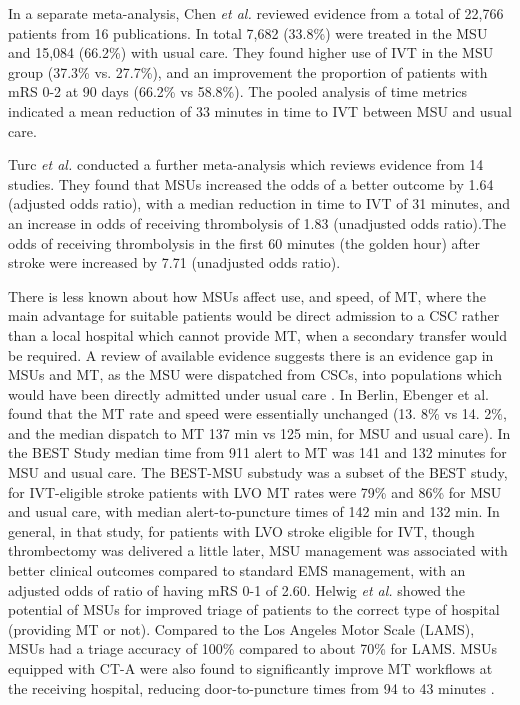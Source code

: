 In a separate meta-analysis, Chen \textit{et al.} \cite{chen_systematic_2022} reviewed evidence from a total of 22,766 patients from 16 publications. In total 7,682 (33.8\%) were treated in the MSU and 15,084 (66.2\%) with usual care. They found higher use of IVT in the MSU group (37.3\% vs. 27.7\%), and an improvement the proportion of patients with mRS 0-2 at 90 days (66.2\% vs 58.8\%).  The pooled analysis of time metrics indicated a mean reduction of 33 minutes in time to IVT between MSU and usual care.

Turc \textit{ et al.} \cite{turc_comparison_2022} conducted a further meta-analysis which reviews evidence from 14 studies. They found that MSUs increased the odds of a better outcome by 1.64 (adjusted odds ratio), with a median reduction in time to IVT of 31 minutes, and an increase in odds of receiving thrombolysis of 1.83 (unadjusted odds ratio).The odds of receiving thrombolysis in the first 60 minutes (the golden hour) after stroke were increased by 7.71 (unadjusted odds ratio).

There is less known about how MSUs affect use, and speed, of MT, where the main advantage for suitable patients would be direct admission to a CSC rather than a local hospital which cannot provide MT, when a secondary transfer would be required. A review of available evidence suggests there is an evidence gap in MSUs and MT, as the MSU were dispatched from CSCs, into populations which would have been directly admitted under usual care \cite{navi_mobile_2022}. In Berlin, Ebenger et al. \cite{ebinger_association_2021} found that the MT rate and speed were essentially unchanged (13. 8\% vs 14. 2\%, and the median dispatch to MT 137 min vs 125 min, for MSU and usual care). In the BEST Study \cite{grotta_prospective_2021} median time from 911 alert to MT was 141 and 132 minutes for MSU and usual care. The BEST-MSU substudy \cite{czap_impact_2024} was a subset of the BEST study, for IVT-eligible stroke patients with LVO MT rates were 79\% and 86\% for MSU and usual care,  with median alert-to-puncture times of 142 min and 132 min. In general, in that study, for patients with LVO stroke eligible for IVT, though thrombectomy was delivered a little later, MSU management was associated with better clinical outcomes compared to standard EMS management, with an adjusted odds of ratio of having mRS 0-1 of 2.60. Helwig \textit{et al.} \cite{helwig_prehospital_2019} showed the potential of MSUs for improved triage of patients to the correct type of hospital (providing MT or not). Compared to the Los Angeles Motor Scale (LAMS), MSUs had a triage accuracy of 100\% compared to about 70\% for LAMS. MSUs equipped with CT-A were also found to significantly improve MT workflows at the receiving hospital, reducing door-to-puncture times from 94 to 43 minutes \cite{czap_mobile_2020)}.

